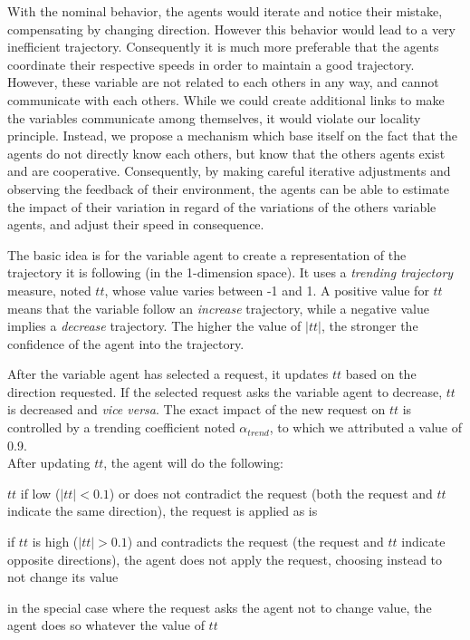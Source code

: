 With the nominal behavior, the agents would iterate and notice their mistake, compensating by changing direction. However this behavior would lead to a very inefficient trajectory. Consequently it is much more preferable that the agents coordinate their respective speeds in order to maintain a good trajectory. However, these variable are not related to each others in any way, and cannot communicate with each others. While we could create additional links to make the variables communicate among themselves, it would violate our locality principle. Instead, we propose a mechanism which base itself on the fact that the agents do not directly know each others, but know that the others agents exist and are cooperative. Consequently, by making careful iterative adjustments and observing the feedback of their environment, the agents can be able to estimate the impact of their variation in regard of the variations of the others variable agents, and adjust their speed in consequence.

The basic idea is for the variable agent to create a representation of the trajectory it is following (in the 1-dimension space). It uses a \emph{trending trajectory} measure, noted $tt$, whose value varies between -1 and 1. A positive value for $tt$ means that the variable follow an \emph{increase} trajectory, while a negative value implies a \emph{decrease} trajectory. The higher the value of $|tt|$, the stronger the confidence of the agent into the trajectory.

After the variable agent has selected a request, it updates $tt$ based on the direction requested. If the selected request asks the variable agent to decrease, $tt$ is decreased and \emph{vice versa}. The exact impact of the new request on $tt$ is controlled by a trending coefficient noted $\alpha_{trend}$, to which we attributed a value of 0.9.\\
After updating $tt$, the agent will do the following:
\begin{compactitem}
\item $tt$ if low ($|tt|< 0.1$) or does not contradict the request (both the request and $tt$ indicate the same direction), the request is applied as is
\item if $tt$ is high ($|tt|> 0.1$) and contradicts the request (the request and $tt$ indicate opposite directions), the agent does not apply the request, choosing instead to not change its value
\item in the special case where the request asks the agent not to change value, the agent does so whatever the value of $tt$
\end{compactitem}

